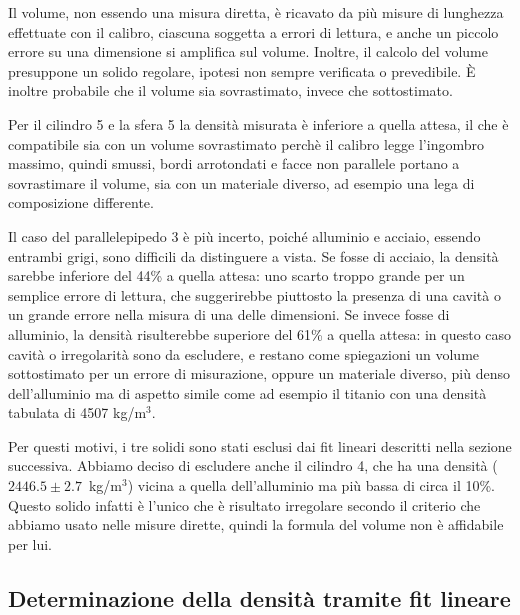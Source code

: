 \documentclass[a4paper]{article}
\begin{document}
Il volume, non essendo una misura diretta, è ricavato da più misure di lunghezza effettuate con il calibro, ciascuna soggetta a errori di lettura, e anche un piccolo errore su una dimensione si amplifica sul volume. Inoltre, il calcolo del volume presuppone un solido regolare, ipotesi non sempre verificata o prevedibile. È inoltre probabile che il volume sia sovrastimato, invece che sottostimato.

Per il cilindro 5 e la sfera 5 la densità misurata è inferiore a quella attesa, il che è compatibile sia con un volume sovrastimato perchè il calibro legge l’ingombro massimo, quindi smussi, bordi arrotondati e facce non parallele portano a sovrastimare il volume, sia con un materiale diverso, ad esempio una lega di composizione differente.

Il caso del parallelepipedo 3 è più incerto, poiché alluminio e acciaio, essendo entrambi grigi, sono difficili da distinguere a vista. Se fosse di acciaio, la densità sarebbe inferiore del 44\% a quella attesa: uno scarto troppo grande per un semplice errore di lettura, che suggerirebbe piuttosto la presenza di una cavità o un grande errore nella misura di una delle dimensioni. Se invece fosse di alluminio, la densità risulterebbe superiore del 61\% a quella attesa: in questo caso cavità o irregolarità sono da escludere, e restano come spiegazioni un volume sottostimato per un errore di misurazione, oppure un materiale diverso, più denso dell'alluminio ma di aspetto simile come ad esempio il titanio con una densità tabulata di 4507 kg/m$^3$.


Per questi motivi, i tre solidi sono stati esclusi dai fit lineari descritti nella sezione successiva. Abbiamo deciso di escludere anche il cilindro 4, che ha una densità ($2446.5 \pm 2.7$~kg/m$^3$) vicina a quella dell'alluminio ma più bassa di circa il 10\%. Questo solido infatti è l'unico che è risultato irregolare secondo il criterio che abbiamo usato nelle misure dirette, quindi la formula del volume non è affidabile per lui.

\subsection{Determinazione della densità tramite fit lineare}\label{sec:fit}
\end{document}
